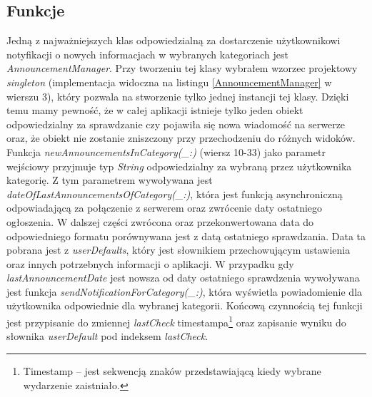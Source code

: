 \documentclass{iiuwb}
\begin{document}
\subsection{Funkcje}
Jedną z najważniejszych klas odpowiedzialną za dostarczenie użytkownikowi notyfikacji o nowych informacjach w wybranych kategoriach jest \textit{AnnouncementManager}. Przy tworzeniu tej klasy wybrałem wzorzec projektowy \textit{singleton} \cite{Gamma:2010:Wzorce} (implementacja widoczna na listingu \ref{AnnouncementManager} w wierszu 3), który pozwala na stworzenie tylko jednej instancji tej klasy. Dzięki temu mamy pewność, że w całej aplikacji istnieje tylko jeden obiekt odpowiedzialny za sprawdzanie czy pojawiła się nowa wiadomość na serwerze oraz, że obiekt nie zostanie zniszczony przy przechodzeniu do różnych widoków. Funkcja \textit{newAnnouncementsInCategory(\_:)} (wiersz 10-33) jako parametr wejściowy przyjmuje typ \textit{String} odpowiedzialny za wybraną przez użytkownika kategorię. Z tym parametrem wywoływana jest \textit{dateOfLastAnnouncementsOfCategory(\_:)}, która jest funkcją asynchroniczną odpowiadającą za połączenie z serwerem oraz zwrócenie daty ostatniego ogłoszenia. W dalszej części zwrócona oraz przekonwertowana data do odpowiedniego formatu porównywana jest z datą ostatniego sprawdzania. Data ta pobrana jest z \textit{userDefaults}, który jest słownikiem  przechowującym ustawienia oraz innych potrzebnych informacji o aplikacji. W przypadku gdy \textit{lastAnnouncementDate} jest nowsza od daty ostatniego sprawdzenia wywoływana jest funkcja \textit{sendNotificationForCategory(\_:)}, która wyświetla powiadomienie dla użytkownika odpowiednie dla wybranej kategorii. Końcową czynnością tej funkcji jest przypisanie do zmiennej \textit{lastCheck} timestampa\footnote{Timestamp -- jest sekwencją znaków przedstawiającą kiedy wybrane wydarzenie zaistniało.} oraz zapisanie wyniku do słownika \textit{userDefault} pod indeksem \textit{lastCheck}.
\newpage
\end{document}
